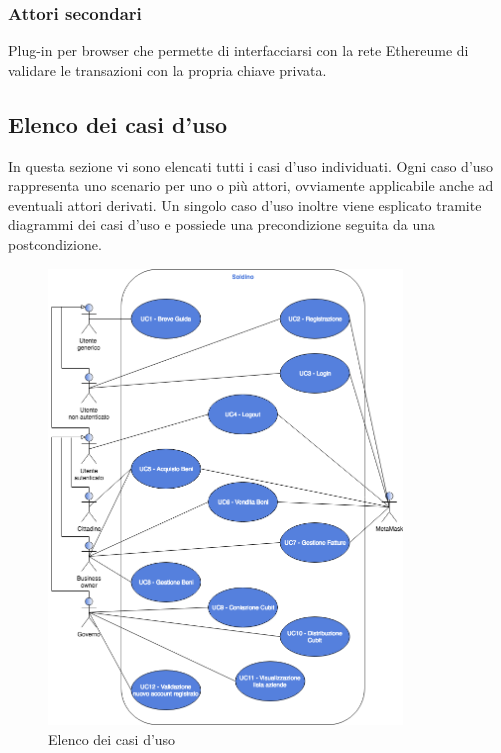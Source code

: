 \subsubsection{Attori secondari}
\begin{description}[style=nextline]
	\item[MetaMask]
	Plug-in per browser che permette di interfacciarsi con la rete Ethereum\glosp e di validare le transazioni con la propria chiave privata.

\end{description}

\subsection{Elenco dei casi d'uso}
In questa sezione vi sono elencati tutti i casi d'uso individuati. Ogni caso d'uso rappresenta uno scenario per uno o più attori, ovviamente applicabile anche ad eventuali attori derivati. Un singolo caso d'uso inoltre viene esplicato tramite diagrammi dei casi d'uso e possiede una precondizione seguita da una postcondizione.
\begin{figure}[h]
	\includegraphics[width=9.38cm]{res/images/Elenco_casi_d_uso.png}
	\centering
	\caption{Elenco dei casi d'uso}
\end{figure}
